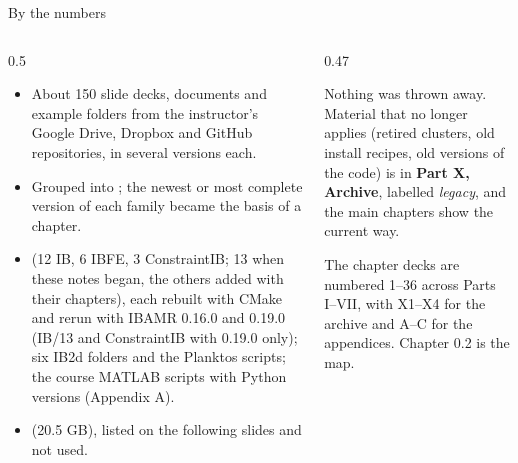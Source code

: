 \documentclass[aspectratio=169,11pt]{beamer}
\begin{document}
\begin{frame}{By the numbers}
\begin{columns}[T,onlytextwidth]
\begin{column}{0.5\textwidth}
\footnotesize
\begin{itemize}
  \item About 150 slide decks, documents and example folders from the instructor's Google Drive, Dropbox and GitHub repositories, in several versions each.
  \item Grouped into ; the newest or most complete version of each family became the basis of a chapter.
  \item {} (12 IB, 6 IBFE, 3 ConstraintIB; 13 when these notes began, the others added with their chapters), each rebuilt with CMake and rerun with IBAMR 0.16.0 and 0.19.0 (IB/13 and ConstraintIB with 0.19.0 only); six IB2d folders and the Planktos scripts; the course MATLAB scripts with Python versions (Appendix A).
  \item {} (20.5 GB), listed on the following slides and not used.
\end{itemize}
\end{column}
\begin{column}{0.47\textwidth}
\begin{punchbox}
\small Nothing was thrown away. Material that no longer applies (retired clusters, old install recipes, old versions of the code) is in \textbf{Part X, Archive}, labelled \emph{legacy}, and the main chapters show the current way.
\end{punchbox}
\vspace{2mm}
\small The chapter decks are numbered 1--36 across Parts I--VII, with X1--X4 for the archive and A--C for the appendices. Chapter 0.2 is the map.
\end{column}
\end{columns}
\end{frame}
\end{document}
